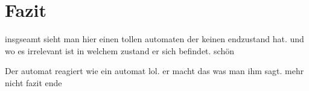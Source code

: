 
\section{Fazit}
insgseamt sieht man hier einen tollen automaten der keinen endzustand hat. und wo es irrelevant ist in welchem zustand er sich befindet. schön

Der automat reagiert wie ein automat lol. er macht das was man ihm sagt.
mehr nicht
fazit ende
